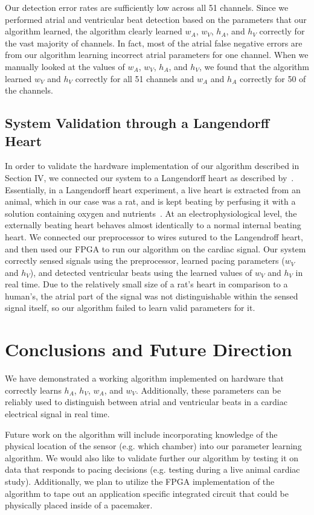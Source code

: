\documentclass[conference]{IEEEtran}
\newcommand{\APW}{\ensuremath{w_A}}
\newcommand{\VPW}{\ensuremath{w_V}}
\newcommand{\APH}{\ensuremath{h_A}}
\newcommand{\VPH}{\ensuremath{h_V}}
\begin{document}
Our detection error rates are sufficiently low across 
all 51 channels. Since we performed atrial and
ventricular beat detection based on the parameters that
our algorithm learned, the algorithm clearly learned
\APW{}, \VPW{}, \APH{}, and \VPH{} correctly for the vast
majority of channels. In fact, most of the atrial false negative
errors are from our algorithm learning incorrect
atrial parameters for one channel. When we manually
looked at the values of \APW{}, \VPW{}, \APH{}, and \VPH{}, we
found that the algorithm learned \VPW{} and \VPH{} correctly
for all 51 channels and \APW{} and \APH{} correctly for 50 of 
the channels.

\subsection{System Validation through a Langendorff Heart}
In order to validate the hardware implementation of
our algorithm described in Section IV, we connected our 
system to a Langendorff heart as described by~\cite{langendorff}.
Essentially, in a Langendorff heart experiment, a live
heart is extracted from an animal, which in our case was
a rat, and is kept beating by perfusing it with a solution containing oxygen and nutrients~\cite{langendorff}. 
At an electrophysiological level, the externally beating heart behaves almost identically to a normal internal beating heart.
We connected our preprocessor to wires
sutured to the Langendroff heart, and then used our
FPGA to run our algorithm on the cardiac signal.
Our system correctly sensed signals using
the preprocessor, learned pacing parameters (\VPW{} and
\VPH{}), and detected ventricular beats using the learned
values of \VPW{} and \VPH{} in real time. Due to the
relatively small size of a rat's heart in comparison to a
human's, the atrial part of the signal was not
distinguishable within the sensed signal itself,%
so our algorithm failed to learn valid parameters for it.

\section{Conclusions and Future Direction}
We have demonstrated a working algorithm
implemented on hardware that correctly learns \APH{},
\VPH{}, \APW{}, and \VPW{}. Additionally, these parameters
can be reliably used to distinguish between atrial and
ventricular beats in a cardiac electrical signal in real time.

Future work on the algorithm will include
	incorporating knowledge of the physical location of the sensor (e.g. which chamber) into our parameter learning algorithm.
We would also like to validate further our algorithm by testing it on data that responds to pacing decisions (e.g. testing during a live animal cardiac study).
Additionally, we plan to utilize the FPGA implementation of
the algorithm to tape out an application specific
integrated circuit that could be physically placed inside
of a pacemaker.
\end{document}
